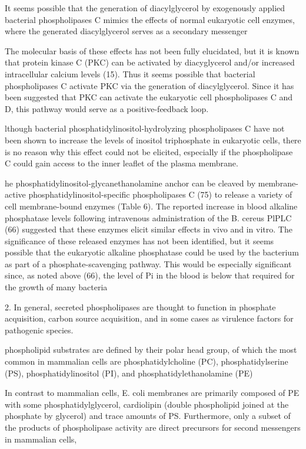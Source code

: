  It seems possible that the generation of diacylglycerol by exogenously applied bacterial phospholipases C mimics the effects of normal eukaryotic cell enzymes, where the generated diacylglycerol serves as a secondary messenger 

 The molecular basis of these effects has not been fully elucidated, but it is known that protein kinase C (PKC) can be activated by diacyglycerol and/or increased intracellular calcium levels (15). Thus it seems possible that bacterial phospholipases C activate PKC via the generation of diacylglycerol. Since it has been suggested that PKC can activate the eukaryotic cell phospholipases C and D, this pathway would serve as a positive-feedback loop.	


 lthough bacterial phosphatidylinositol-hydrolyzing phospholipases C have not been shown to increase the levels of inositol triphosphate in eukaryotic cells, there is no reason why this effect could not be elicited, especially if the phospholipase C could gain access to the inner leaflet of the plasma membrane.


 he phosphatidylinositol-glycanethanolamine anchor can be cleaved by membrane-active phosphatidylinositol-specific phospholipases C (75) to release a variety of cell membrane-bound enzymes (Table 6). The reported increase in blood alkaline phosphatase levels following intravenous administration of the B. cereus PlPLC (66) suggested that these enzymes elicit similar effects in vivo and in vitro. The significance of these released enzymes has not been identified, but it seems possible that the eukaryotic alkaline phosphatase could be used by the bacterium as part of a phosphate-scavenging pathway. This would be especially significant since, as noted above (66), the level of Pi in the blood is below that required for the growth of many bacteria


2.
In general, secreted phospholipases are thought to function in phosphate acquisition, carbon source acquisition, and in some cases as virulence factors for pathogenic species.

phospholipid substrates are deﬁned by their polar head group, of which the most common in mammalian cells are phosphatidylcholine (PC), phosphatidylserine (PS), phosphatidylinositol (PI), and phosphatidylethanolamine (PE)

In contrast to mammalian cells, E. coli membranes are primarily composed of PE with some phosphatidylglycerol, cardiolipin (double phospholipid joined at the phosphate by glycerol) and trace amounts of PS. Furthermore, only a subset of the products of phospholipase activity are direct precursors for second messengers in mammalian cells, 

